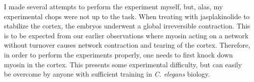 I made several attempts to perform the experiment myself, but, alas, my experimental chops were not up to the task.  When treating with jasplakinolide to stabilize the cortex, the embryos underwent a global irreversible contraction. This is to be expected from our earlier observations where myosin acting on a network without turnover causes network contraction and tearing of the cortex. Therefore, in order to perform the experiments properly, one needs to first knock down myosin in the cortex.  This presents some experimental difficulty, but can easily be overcome by anyone with sufficient training in \textit{C. elegans} biology.
